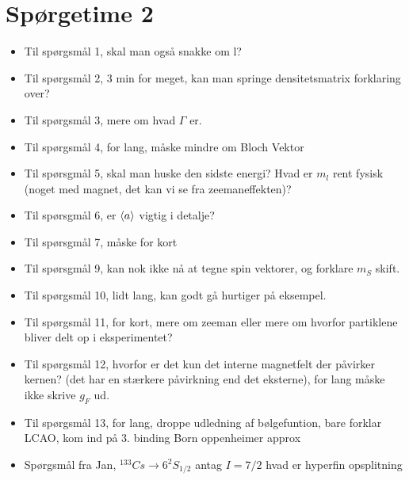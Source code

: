 \documentclass[a4paper,oneside,article]{memoir}
\begin{document}
\section*{Spørgetime 2}
\begin{itemize}
    \item Til spørgsmål 1, skal man også snakke om l? 
    \item Til spørgsmål 2, 3 min for meget, kan man springe densitetsmatrix forklaring over?
    \item Til spørgsmål 3, mere om hvad $Γ$ er. 
    \item Til spørgsmål 4, for lang, måske mindre om Bloch Vektor 
    \item Til spørsgmål 5, skal man huske den sidste energi? Hvad er $m_l$ rent fysisk (noget med magnet, det kan vi se fra zeemaneffekten)?
    \item Til spørsgmål 6, er $\br[3]{a}$ vigtig i detalje?
    \item Til spørsgmål 7, måske for kort  
    \item Til spørsgmål 9, kan nok ikke nå at tegne spin vektorer, og forklare $m_S$ skift. 
    \item Til spørgsmål 10, lidt lang, kan godt gå hurtiger på eksempel. 
    \item Til spørgsmål 11, for kort, mere om zeeman eller mere om hvorfor partiklene bliver delt op i eksperimentet? 
    \item Til spørgsmål 12, hvorfor er det kun det interne magnetfelt der påvirker kernen? (det har en stærkere påvirkning end det eksterne), for lang måske ikke skrive $g_F$ ud. 
    \item Til spørgsmål 13, for lang, droppe udledning af bølgefuntion, bare forklar LCAO, kom ind på 3. binding
    Born oppenheimer approx 
    \item Spørgsmål fra Jan, $ ^{133}Cs \rightarrow 6^2S_{1/2}$ antag $I=7/2$ hvad er hyperfin opsplitning
\end{itemize}
\end{document}
